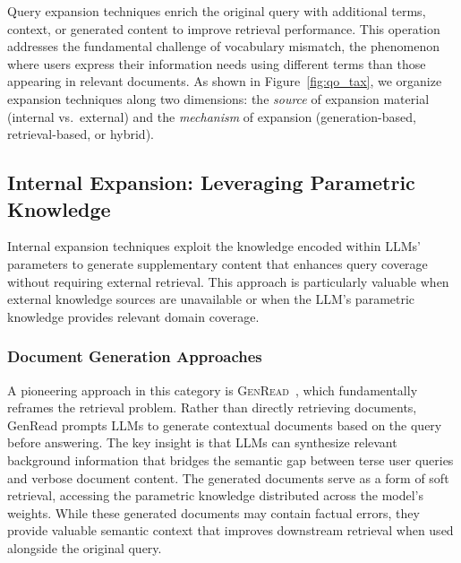 \documentclass{article}
\begin{document}
Query expansion techniques enrich the original query with additional terms, context, or generated content to improve retrieval performance. This operation addresses the fundamental challenge of vocabulary mismatch, the phenomenon where users express their information needs using different terms than those appearing in relevant documents. As shown in Figure~\ref{fig:qo_tax}, we organize expansion techniques along two dimensions: the \textit{source} of expansion material (internal vs.\ external) and the \textit{mechanism} of expansion (generation-based, retrieval-based, or hybrid).

\vspace{0.3em}
\noindent{}
\vspace{0.3em}

\subsection{Internal Expansion: Leveraging Parametric Knowledge}

Internal expansion techniques exploit the knowledge encoded within LLMs' parameters to generate supplementary content that enhances query coverage without requiring external retrieval. This approach is particularly valuable when external knowledge sources are unavailable or when the LLM's parametric knowledge provides relevant domain coverage.

\subsubsection{Document Generation Approaches}

A pioneering approach in this category is \textsc{GenRead}~\citep{GenRead}, which fundamentally reframes the retrieval problem. Rather than directly retrieving documents, GenRead prompts LLMs to generate contextual documents based on the query before answering. The key insight is that LLMs can synthesize relevant background information that bridges the semantic gap between terse user queries and verbose document content. The generated documents serve as a form of soft retrieval, accessing the parametric knowledge distributed across the model's weights. While these generated documents may contain factual errors, they provide valuable semantic context that improves downstream retrieval when used alongside the original query.
\end{document}
